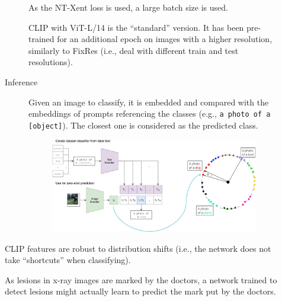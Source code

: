 \begin{description}
\begin{description}
                \begin{remark}
                    As the NT-Xent loss is used, a large batch size is used.
                \end{remark}

                \begin{remark}
                    CLIP with ViT-L/14 is the ``standard'' version. It has been pre-trained for an additional epoch on images with a higher resolution, similarly to FixRes (i.e., deal with different train and test resolutions).
                \end{remark}

            \item[Inference]
                Given an image to classify, it is embedded and compared with the embeddings of prompts referencing the classes (e.g., \texttt{a photo of a [object]}). The closest one is considered as the predicted class.
                \begin{figure}[H]
                    \centering
                    \includegraphics[width=0.85\linewidth]{./img/_clip_inference.jpg}
                \end{figure}
        \end{description}

        \begin{remark}
            CLIP features are robust to distribution shifts (i.e., the network does not take ``shortcuts'' when classifying).

            \indenttbox
            \begin{example}
                As lesions in x-ray images are marked by the doctors, a network trained to detect lesions might actually learn to predict the mark put by the doctors.
            \end{example}


\end{remark}
\end{description}
